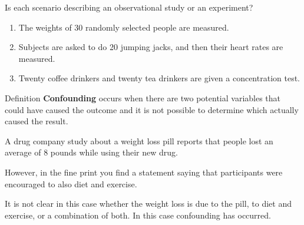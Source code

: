 \documentclass{beamer}
\begin{document}
\begin{frame}
\begin{example}
Is each scenario describing an observational study or an experiment?
\begin{enumerate}
\item<1->   The weights of 30 randomly selected people are measured. \\
\item<3->   Subjects are asked to do 20 jumping jacks, and then their heart rates are measured. \\
\item<5->  Twenty coffee drinkers and twenty tea drinkers are given a concentration test. \\
\end{enumerate}
\end{example}
\end{frame}

\begin{frame}
\begin{block}{Definition}
\textbf{Confounding} occurs when there are two potential variables that could have caused the outcome and it is not possible to determine which actually caused the result.
\end{block}\pause

\begin{example}
A drug company study about a weight loss pill reports that people lost an average of 8 pounds while using their new drug. \pause

\vspace{2mm}
However, in the fine print you find a statement saying that participants were encouraged to also diet and exercise. \pause

\vspace{2mm}
It is not clear in this case whether the weight loss is due to the pill, to diet and exercise, or a combination of both. In this case confounding has occurred.
\end{example}
\end{frame}
\end{document}

